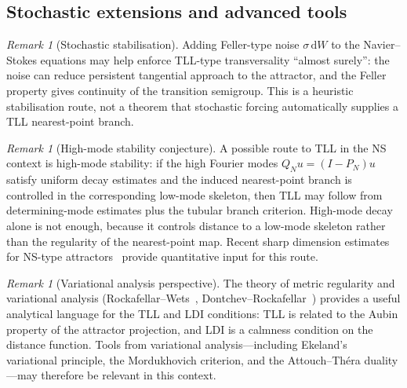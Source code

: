 \documentclass[12pt,a4paper]{article}
\theoremstyle{definition}
\theoremstyle{plain}
\theoremstyle{remark}
\newtheorem{remark}[definition]{Remark}
\begin{document}
\subsection{Stochastic extensions and advanced tools}

\begin{remark}[Stochastic stabilisation]
\label{rem:stochastic-stabilisation}
Adding Feller-type noise $\sigma\,\mathrm{d}W$ to the Navier--Stokes equations may help enforce TLL-type transversality ``almost surely'': the noise can reduce persistent tangential approach to the attractor, and the Feller property gives continuity of the transition semigroup. This is a heuristic stabilisation route, not a theorem that stochastic forcing automatically supplies a TLL nearest-point branch.
\end{remark}

\begin{remark}[High-mode stability conjecture]
\label{rem:high-mode-stability}
A possible route to TLL in the NS context is high-mode stability: if the high Fourier modes $Q_N u = (I - P_N)u$ satisfy uniform decay estimates and the induced nearest-point branch is controlled in the corresponding low-mode skeleton, then TLL may follow from determining-mode estimates plus the tubular branch criterion. High-mode decay alone is not enough, because it controls distance to a low-mode skeleton rather than the regularity of the nearest-point map. Recent sharp dimension estimates for NS-type attractors~\cite{IlyinKalantarovZelik2025} provide quantitative input for this route.
\end{remark}

\begin{remark}[Variational analysis perspective]
\label{rem:variational-analysis}
The theory of metric regularity and variational analysis (Rockafellar--Wets~\cite{RockafellarWets1998}, Dontchev--Rockafellar~\cite{DontchevRockafellar2009}) provides a useful analytical language for the TLL and LDI conditions: TLL is related to the Aubin property of the attractor projection, and LDI is a calmness condition on the distance function. Tools from variational analysis---including Ekeland's variational principle, the Mordukhovich criterion, and the Attouch--Théra duality---may therefore be relevant in this context.
\end{remark}

\end{document}
